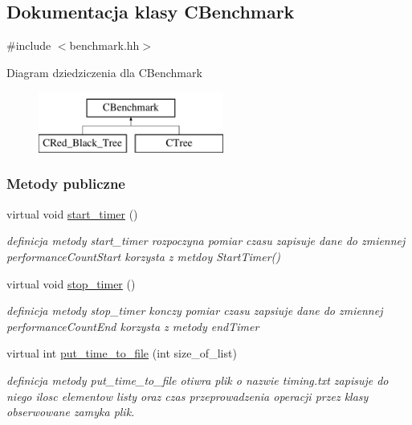 \hypertarget{class_c_benchmark}{}\subsection{Dokumentacja klasy C\+Benchmark}
\label{class_c_benchmark}


{\ttfamily \#include $<$benchmark.\+hh$>$}

Diagram dziedziczenia dla C\+Benchmark\begin{figure}[H]
\begin{center}
\leavevmode
\includegraphics[height=2.000000cm]{class_c_benchmark}
\end{center}
\end{figure}
\subsubsection*{Metody publiczne}
\begin{DoxyCompactItemize}
\item 
virtual void \hyperlink{class_c_benchmark_aa6f22bf0b316b51db8f439c7420a1666}{start\+\_\+timer} ()
\begin{DoxyCompactList}\small\item\em definicja metody start\+\_\+timer rozpoczyna pomiar czasu zapisuje dane do zmiennej performance\+Count\+Start korzysta z metdoy Start\+Timer() \end{DoxyCompactList}\item 
virtual void \hyperlink{class_c_benchmark_a945aaa453776cd11395166b470d11778}{stop\+\_\+timer} ()
\begin{DoxyCompactList}\small\item\em definicja metody stop\+\_\+timer konczy pomiar czasu zapsiuje dane do zmiennej performance\+Count\+End korzysta z metody end\+Timer \end{DoxyCompactList}\item 
virtual int \hyperlink{class_c_benchmark_acb3046f4f9fdff7c17c7633baf41cf36}{put\+\_\+time\+\_\+to\+\_\+file} (int size\+\_\+of\+\_\+list)
\begin{DoxyCompactList}\small\item\em definicja metody put\+\_\+time\+\_\+to\+\_\+file otiwra plik o nazwie \textquotesingle{}timing.\+txt\textquotesingle{} zapisuje do niego ilosc elementow listy oraz czas przeprowadzenia operacji przez klasy obserwowane zamyka plik. \end{DoxyCompactList}\end{DoxyCompactItemize}
